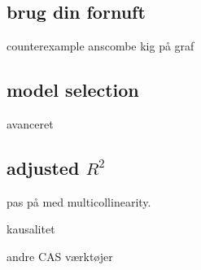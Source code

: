 \subsection{brug din fornuft}
counterexample
anscombe
kig på graf

\subsection{model selection}
avanceret
\subsection{adjusted \(R^2\)}


pas på med multicollinearity.

kausalitet

andre CAS værktøjer
